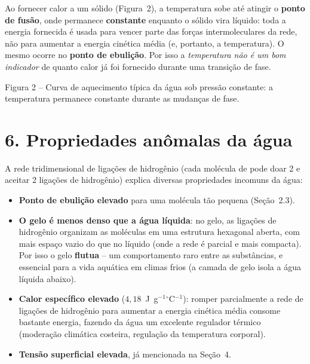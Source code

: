 \documentclass[11pt,a4paper]{article}
\newcommand{\oC}{$^\circ$C}
\begin{document}
Ao fornecer calor a um sólido (Figura~2), a temperatura sobe até atingir o
\textbf{ponto de fusão}, onde permanece \textbf{constante} enquanto o
sólido vira líquido: toda a energia fornecida é usada para vencer parte
das forças intermoleculares da rede, não para aumentar a energia cinética
média (e, portanto, a temperatura). O mesmo ocorre no \textbf{ponto de
ebulição}. Por isso a \emph{temperatura não é um bom indicador} de quanto
calor já foi fornecido durante uma transição de fase.

\begin{center}


{\small Figura 2 -- Curva de aquecimento típica da água sob pressão
constante: a temperatura permanece constante durante as mudanças de fase.}
\end{center}

\section*{6. Propriedades anômalas da água}

A rede tridimensional de ligações de hidrogênio (cada molécula de
 pode doar 2 e aceitar 2 ligações de hidrogênio) explica diversas
propriedades incomuns da água:

\begin{itemize}
\item \textbf{Ponto de ebulição elevado} para uma molécula tão pequena
  (Seção~2.3).
\item \textbf{O gelo é menos denso que a água líquida}: no gelo, as
  ligações de hidrogênio organizam as moléculas em uma estrutura
  hexagonal aberta, com mais espaço vazio do que no líquido (onde a rede
  é parcial e mais compacta). Por isso o gelo \textbf{flutua} -- um
  comportamento raro entre as substâncias, e essencial para a vida
  aquática em climas frios (a camada de gelo isola a água líquida abaixo).
\item \textbf{Calor específico elevado} ($4{,}18$~J~g$^{-1}$\oC$^{-1}$):
  romper parcialmente a rede de ligações de hidrogênio para aumentar a
  energia cinética média consome bastante energia, fazendo da água um
  excelente regulador térmico (moderação climática costeira, regulação da
  temperatura corporal).
\item \textbf{Tensão superficial elevada}, já mencionada na Seção~4.
\end{itemize}
\end{document}
